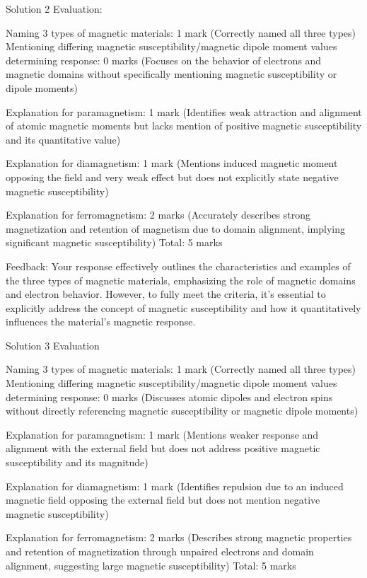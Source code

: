 \documentclass[a4paper,11pt]{article}
\begin{document}
Solution 2 Evaluation:

Naming 3 types of magnetic materials: 1 mark (Correctly named all three types)
Mentioning differing magnetic susceptibility/magnetic dipole moment values determining response: 0 marks (Focuses on the behavior of electrons and magnetic domains without specifically mentioning magnetic susceptibility or dipole moments)

Explanation for paramagnetism: 1 mark (Identifies weak attraction and alignment of atomic magnetic moments but lacks mention of positive magnetic susceptibility and its quantitative value)

Explanation for diamagnetism: 1 mark (Mentions induced magnetic moment opposing the field and very weak effect but does not explicitly state negative magnetic susceptibility)

Explanation for ferromagnetism: 2 marks (Accurately describes strong magnetization and retention of magnetism due to domain alignment, implying significant magnetic susceptibility)
Total: 5 marks

Feedback: Your response effectively outlines the characteristics and examples of the three types of magnetic materials, emphasizing the role of magnetic domains and electron behavior. However, to fully meet the criteria, it's essential to explicitly address the concept of magnetic susceptibility and how it quantitatively influences the material's magnetic response.

Solution 3 Evaluation

Naming 3 types of magnetic materials: 1 mark (Correctly named all three types)
Mentioning differing magnetic susceptibility/magnetic dipole moment values determining response: 0 marks (Discusses atomic dipoles and electron spins without directly referencing magnetic susceptibility or magnetic dipole moments)

Explanation for paramagnetism: 1 mark (Mentions weaker response and alignment with the external field but does not address positive magnetic susceptibility and its magnitude)

Explanation for diamagnetism: 1 mark (Identifies repulsion due to an induced magnetic field opposing the external field but does not mention negative magnetic susceptibility)

Explanation for ferromagnetism: 2 marks (Describes strong magnetic properties and retention of magnetization through unpaired electrons and domain alignment, suggesting large magnetic susceptibility)
Total: 5 marks
\end{document}
